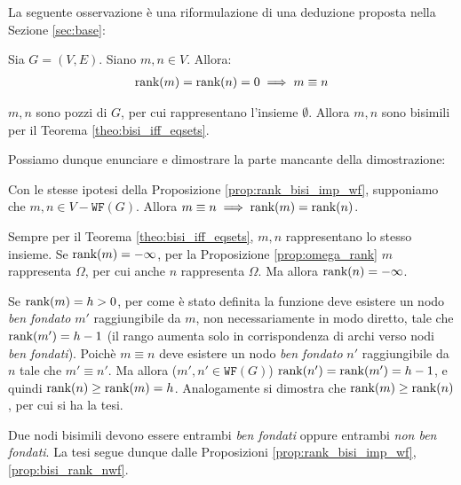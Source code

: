 La seguente osservazione è una riformulazione di una deduzione proposta nella Sezione \ref{sec:base}:
\begin{observation}
    Sia $G = (V,E)$. Siano $m,n \in V$. Allora:
    \begin{gather*}
        \textup{rank}(m) = \textup{rank}(n) = 0 \implies m \equiv n
    \end{gather*}
\end{observation}
\begin{proof2}
    $m,n$ sono pozzi di $G$, per cui rappresentano l'insieme $\emptyset$. Allora $m,n$ sono bisimili per il Teorema \ref{theo:bisi_iff_eqsets}.
\end{proof2}

Possiamo dunque enunciare e dimostrare la parte mancante della dimostrazione:
\begin{proposition}
    \label{prop:bisi_rank_nwf}
    Con le stesse ipotesi della Proposizione \ref{prop:rank_bisi_imp_wf}, supponiamo che $m,n \in V - \texttt{WF}(G)$. Allora $m \equiv n \implies \textup{rank}(m) = \textup{rank}(n)$.
\end{proposition}
\begin{proof2}
    Sempre per il Teorema \ref{theo:bisi_iff_eqsets}, $m,n$ rappresentano lo stesso insieme. Se $\textup{rank}(m) = -\infty$, per la Proposizione \ref{prop:omega_rank} $m$ rappresenta $\Omega$, per cui anche $n$ rappresenta $\Omega$. Ma allora $\textup{rank}(n) = -\infty$.

    Se $\textup{rank}(m) = h > 0$, per come è stato definita la funzione \rankfunc deve esistere un nodo \emph{ben fondato} $m'$ raggiungibile da $m$, non necessariamente in modo diretto, tale che $\textup{rank}(m') = h-1$ (il rango aumenta solo in corrispondenza di archi verso nodi \emph{ben fondati}). Poichè $m \equiv n$ deve esistere un nodo \emph{ben fondato} $n'$ raggiungibile da $n$ tale che $m' \equiv n'$. Ma allora ($m',n' \in \texttt{WF}(G)$) $\textup{rank}(n') = \textup{rank}(m') = h-1$, e quindi $\textup{rank}(n) \geq \textup{rank}(m) = h$. Analogamente si dimostra che $\textup{rank}(m) \geq \textup{rank}(n)$, per cui si ha la tesi.
\end{proof2}

\begin{proof2}
    Due nodi bisimili devono essere entrambi \emph{ben fondati} oppure entrambi \emph{non ben fondati}. La tesi segue dunque dalle Proposizioni \ref{prop:rank_bisi_imp_wf}, \ref{prop:bisi_rank_nwf}.
\end{proof2}

